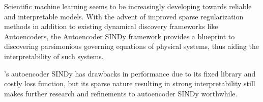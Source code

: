 

Scientific machine learning seems to be increasingly developing towards reliable and interpretable models. 
With the advent of improved sparse regularization methods in addition to existing dynamical discovery frameworks like Autoencoders, the Autoencoder SINDy framework provides a blueprint to discovering parsimonious governing equations of physical systems, thus aiding the interpretability of such systems. 

\textcite{Champion_2019}'s autoencoder SINDy has drawbacks in performance due to its fixed library and costly loss function, but its sparse nature resulting in strong interpretability still makes further research and refinements to autoencoder SINDy worthwhile.